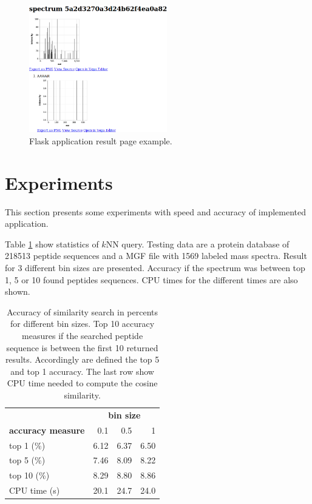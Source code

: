 \documentclass[a4paper,10pt,twocolumn]{article}
\begin{document}
\begin{figure}[H]
    \begin{center}
        \includegraphics[width=6cm]{img/output-sample}
    \end{center}
    \caption{Flask application result page example.}
    \label{fig:sample}
\end{figure}

\section{Experiments}

This section presents some experiments with speed and accuracy of
implemented application.

Table \ref{table:experiments} show statistics of \(k\)NN query.
Testing data are a protein database of 218513 peptide sequences and a MGF file
with 1569 labeled mass spectra. Result for 3 different bin sizes are presented.
Accuracy if the spectrum was between top 1, 5 or 10 found peptides sequences.
CPU times for the different times are also shown.

\begin{table}[H]
    \begin{center}
        \label{table:experiments}
        \begin{tabular}{l|rrr}
            & \multicolumn{3}{c}{\textbf{bin size}} \\
            \textbf{accuracy measure} & 0.1 & 0.5 & 1 \\
            \hline
            top 1 (\%) & 6.12 & 6.37 & 6.50 \\
            top 5 (\%) & 7.46 & 8.09 & 8.22 \\
            top 10 (\%) & 8.29 & 8.80 & 8.86 \\
            CPU time (s) & 20.1 & 24.7 & 24.0 \\
        \end{tabular}
        \caption{
            Accuracy of similarity search in percents for different bin sizes.
            Top 10 accuracy measures if the searched peptide sequence is between
            the first 10 returned results. Accordingly are defined the top 5
            and top 1 accuracy. The last row show CPU time needed to compute
            the cosine similarity.
        }
    \end{center}
\end{table}
\end{document}
